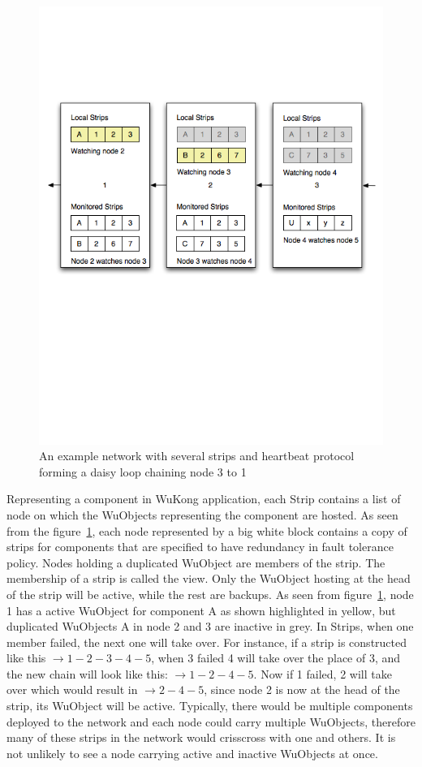 \begin{figure}[h!]
\centering
    \includegraphics[width=\linewidth]{figures/strip1}
\caption{An example network with several strips and heartbeat protocol forming
  a daisy loop chaining node 3 to 1}
\label{fig:strip1}
\end{figure}

Representing a component in WuKong application, each Strip contains a list of
node on which the WuObjects representing the component are hosted. As seen from
the figure~\ref{fig:strip1}, each node represented by a big white block contains
a copy of strips for components that are specified to have redundancy in fault
tolerance policy. Nodes holding a duplicated WuObject are members of the strip.
The membership of a strip is called the view. Only the WuObject hosting at the
head of the strip will be active, while the rest are backups.  As seen from
figure~\ref{fig:strip1}, node 1 has a active WuObject for component A as shown
highlighted in yellow, but duplicated WuObjects A in node 2 and 3 are inactive
in grey. In Strips, when one member failed, the next one will take over. For
instance, if a strip is constructed like this $\rightarrow 1-2-3-4-5$, when
3 failed 4 will take over the place of 3, and the new chain will look like this:
$\rightarrow 1-2-4-5$. Now if 1 failed, 2 will take over which would result in
$\rightarrow 2-4-5$, since node 2 is now at the head of the strip, its WuObject
will be active. Typically, there would be multiple components deployed to the
network and each node could carry multiple WuObjects, therefore many of these
strips in the network would crisscross with one and others. It is not unlikely
to see a node carrying active and inactive WuObjects at once.

